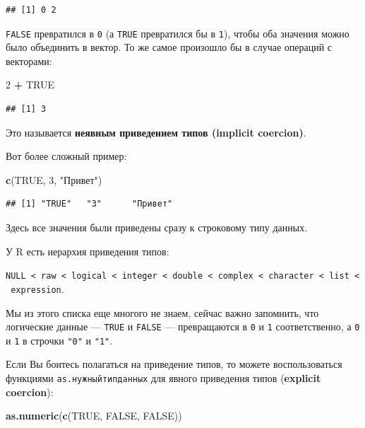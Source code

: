 \documentclass[]{book}
\newenvironment{Shaded}{\begin{snugshade}}{\end{snugshade}}
\newcommand{\KeywordTok}[1]{\textcolor[rgb]{0.13,0.29,0.53}{\textbf{#1}}}
\newcommand{\DecValTok}[1]{\textcolor[rgb]{0.00,0.00,0.81}{#1}}
\newcommand{\StringTok}[1]{\textcolor[rgb]{0.31,0.60,0.02}{#1}}
\newcommand{\OtherTok}[1]{\textcolor[rgb]{0.56,0.35,0.01}{#1}}
\newcommand{\OperatorTok}[1]{\textcolor[rgb]{0.81,0.36,0.00}{\textbf{#1}}}
\newcommand{\NormalTok}[1]{#1}
\begin{document}
\begin{verbatim}
## [1] 0 2
\end{verbatim}

\texttt{FALSE} превратился в \texttt{0} (а \texttt{TRUE} превратился бы
в \texttt{1}), чтобы оба значения можно было объединить в вектор. То же
самое произошло бы в случае операций с векторами:

\begin{Shaded}
\begin{Highlighting}[]
\DecValTok{2} \OperatorTok{+}\StringTok{ }\OtherTok{TRUE}
\end{Highlighting}
\end{Shaded}

\begin{verbatim}
## [1] 3
\end{verbatim}

Это называется \textbf{неявным приведением типов (implicit coercion)}.

Вот более сложный пример:

\begin{Shaded}
\begin{Highlighting}[]
\KeywordTok{c}\NormalTok{(}\OtherTok{TRUE}\NormalTok{, }\DecValTok{3}\NormalTok{, }\StringTok{"Привет"}\NormalTok{)}
\end{Highlighting}
\end{Shaded}

\begin{verbatim}
## [1] "TRUE"   "3"      "Привет"
\end{verbatim}

Здесь все значения были приведены сразу к строковому типу данных.

У R есть иерархия приведения типов:

\texttt{NULL\ \textless{}\ raw\ \textless{}\ logical\ \textless{}\ integer\ \textless{}\ double\ \textless{}\ complex\ \textless{}\ character\ \textless{}\ list\ \textless{}\ expression}.

Мы из этого списка еще многого не знаем, сейчас важно запомнить, что
логические данные --- \texttt{TRUE} и \texttt{FALSE} --- превращаются в
\texttt{0} и \texttt{1} соответственно, а \texttt{0} и \texttt{1} в
строчки \texttt{"0"} и \texttt{"1"}.

Если Вы боитесь полагаться на приведение типов, то можете
воспользоваться функциями \texttt{as.нужныйтипданных} для явного
приведения типов (\textbf{explicit coercion}):

\begin{Shaded}
\begin{Highlighting}[]
\KeywordTok{as.numeric}\NormalTok{(}\KeywordTok{c}\NormalTok{(}\OtherTok{TRUE}\NormalTok{, }\OtherTok{FALSE}\NormalTok{, }\OtherTok{FALSE}\NormalTok{))}
\end{Highlighting}
\end{Shaded}
\end{document}
